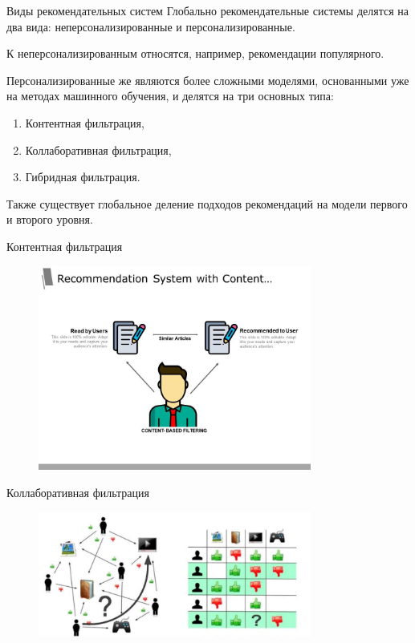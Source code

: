 \documentclass{beamer}
\begin{document}
\begin{frame}{Виды рекомендательных систем}
  Глобально рекомендательные системы делятся на два вида: неперсонализированные и персонализированные.
  
  К неперсонализированным относятся, например, рекомендации популярного.

  Персонализированные же являются более сложными моделями, основанными уже на методах машинного обучения, и
  делятся на три основных типа:
  \begin{enumerate}
    \item Контентная фильтрация,
    \item Коллаборативная фильтрация,
    \item Гибридная фильтрация.
  \end{enumerate}

  Также существует глобальное деление подходов рекомендаций на модели первого и второго уровня.
\end{frame}

\begin{frame}{Контентная фильтрация}
  \begin{figure}[H]
    \centering
    \includegraphics[width=0.8\textwidth]{2}
    \label{fig:img1}
  \end{figure}  
\end{frame}

\begin{frame}{Коллаборативная фильтрация}
  \begin{figure}[H]
    \centering
    \includegraphics[width=0.8\textwidth]{3}
    \label{fig:img1}
  \end{figure}  
\end{frame}
\end{document}
